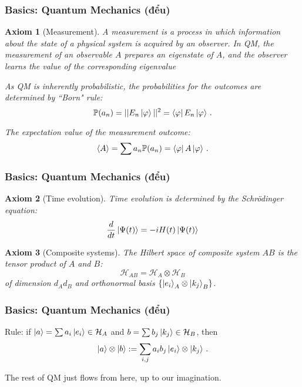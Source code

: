 \documentclass[12pt]{beamer}
\newtheorem{axiom}{Axiom}
\begin{document}
\begin{frame}
\frametitle{Basics: Quantum Mechanics (đểu)}
\begin{axiom}[Measurement]
    A measurement is a process in which information about the state of a physical system
    is acquired by an observer. 
    In QM, the measurement of an observable $A$ prepares an eigenstate of $A$, 
    and the observer learns the value of the corresponding eigenvalue 

    As QM is inherently probabilistic, the probabilities for the outcomes are determined by ``Born" rule:
    \begin{equation*}
        \mathbb{P}(a_n) = || E_n \ket{\varphi} ||^2 = \bra{\varphi} E_n \ket{\varphi} \,. 
    \end{equation*}

    The expectation value of the measurement outcome:
    \pause
    \begin{equation*}
        \langle A \rangle = \sum a_n \mathbb{P}(a_n) = \bra{\varphi} A \ket{\varphi} \,.
    \end{equation*}
\end{axiom}
    
\end{frame}


\begin{frame}
\frametitle{Basics: Quantum Mechanics (đểu)}
\begin{axiom}[Time evolution]
    Time evolution is determined by the Schr\"odinger equation:
    \begin{equation*}
    \frac{d}{dt} \ket{\Psi(t)} = -i H(t)\ket{\Psi(t)}
    \end{equation*}
\end{axiom}

\begin{axiom}[Composite systems]
    The Hilbert space of composite system $AB$ is the tensor product of $A$ and $B$:
    \begin{equation*}
        \mathcal{H}_{AB} = \mathcal{H}_A \otimes \mathcal{H}_B
    \end{equation*}
    of dimension $d_A d_B$ and orthonormal basis $\{ \ket{e_i}_A \otimes \ket{k_j}_B \}$.
\end{axiom}

\end{frame}


\begin{frame}
\frametitle{Basics: Quantum Mechanics (đểu)}
Rule: if $\ket{a} = \sum a_i \ket{e_i} \in \mathcal{H}_A$ and 
$b = \sum b_j \ket{k_j} \in \mathcal{H}_B$, then
\begin{equation*}
    \ket{a} \otimes \ket{b} := \sum_{i,j} a_ib_j \ket{e_i}\otimes \ket{k_j} \,.
\end{equation*}
\pause

The rest of QM just flows from here, up to our imagination.
\end{frame}
\end{document}
